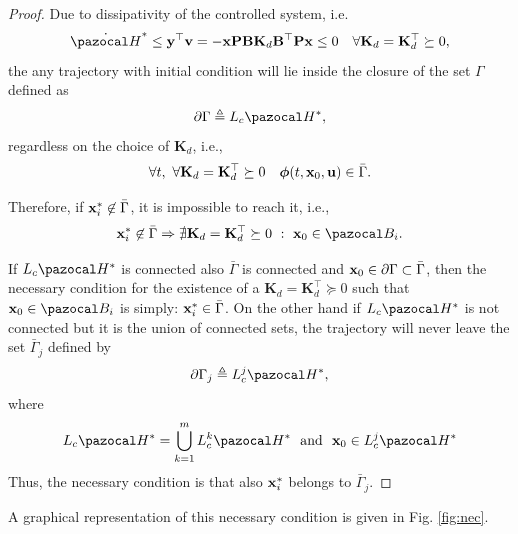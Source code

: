 \begin{proof}
Due to dissipativity of the controlled system, i.e.
%
\begin{equation}
    \dot{\Ha}^*\leq \yb^\top\vb =-\xb\Pb\Bb\mathbf{K}_d\Bb^\top\Pb\xb\leq 0 \quad\forall \mathbf{K}_d=\mathbf{K}_d^\top\succeq 0,
\end{equation}
%
the any trajectory with initial condition will lie inside the closure of the set $\Gamma$ defined as 
%
\begin{equation}
    \partial \Gamma \triangleq {L}_c\Ha^*,
\end{equation}
%
regardless on the choice of $\mathbf{K}_d$, i.e.,
%
\begin{equation}
    \forall t,~\forall \mathbf{K}_d=\mathbf{K}_d^\top\succeq 0\quad\bm\phi(t,\mathbf{x}_0,\mathbf{u})\in \bar{\Gamma}.
\end{equation}
%

Therefore, if $\mathbf{x}_i^*\not\in\bar{\Gamma}$, it is impossible to reach it, i.e.,
%
\begin{equation}
    \xb_i^*\not\in\bar{\Gamma} \Rightarrow \nexists \mathbf{K}_d=\mathbf{K}_d^\top\succeq 0~:~\xb_0\in\B_i.
\end{equation}
%

If ${L}_c\Ha^*$ is connected also $\bar{\Gamma}$ is connected and $\mathbf{x}_0\in\partial \Gamma\subset \bar{\Gamma}$, then the necessary condition for the existence of a $\mathbf{K}_d=\mathbf{K}_d^\top\succeq 0$ such that $\xb_0\in\B_i$ is simply: $\mathbf{x}_i^*\in\bar{\Gamma}$. On the other hand if ${L}_c\Ha^*$ is not connected but it is the union of connected sets, the trajectory will never leave the set $\bar{\Gamma}_j$ defined by 
%
\begin{equation}
    \partial \Gamma_j \triangleq {L}_c^j\Ha^*,
\end{equation}
%
where
%
\begin{equation}
	{L}_c\Ha^* = \bigcup_{k = 1}^m{L}_c^k\Ha^*~~\text{and}~~\xb_0\in{L}_c^j\Ha^* 
\end{equation}
% 
Thus, the necessary condition is that also $\mathbf{x}_i^*$ belongs to $\bar{\Gamma}_j$.
\end{proof}
%
A graphical representation of this necessary condition is given in Fig. \ref{fig:nec}.
%
